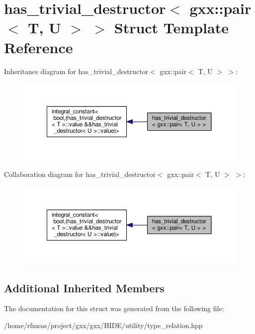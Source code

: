 \hypertarget{structhas__trivial__destructor_3_01gxx_1_1pair_3_01T_00_01U_01_4_01_4}{}\section{has\+\_\+trivial\+\_\+destructor$<$ gxx\+:\+:pair$<$ T, U $>$ $>$ Struct Template Reference}
\label{structhas__trivial__destructor_3_01gxx_1_1pair_3_01T_00_01U_01_4_01_4}


Inheritance diagram for has\+\_\+trivial\+\_\+destructor$<$ gxx\+:\+:pair$<$ T, U $>$ $>$\+:
\nopagebreak
\begin{figure}[H]
\begin{center}
\leavevmode
\includegraphics[width=350pt]{structhas__trivial__destructor_3_01gxx_1_1pair_3_01T_00_01U_01_4_01_4__inherit__graph}
\end{center}
\end{figure}


Collaboration diagram for has\+\_\+trivial\+\_\+destructor$<$ gxx\+:\+:pair$<$ T, U $>$ $>$\+:
\nopagebreak
\begin{figure}[H]
\begin{center}
\leavevmode
\includegraphics[width=350pt]{structhas__trivial__destructor_3_01gxx_1_1pair_3_01T_00_01U_01_4_01_4__coll__graph}
\end{center}
\end{figure}
\subsection*{Additional Inherited Members}


The documentation for this struct was generated from the following file\+:\begin{DoxyCompactItemize}
\item 
/home/rfmeas/project/gxx/gxx/\+H\+I\+D\+E/utility/type\+\_\+relation.\+hpp\end{DoxyCompactItemize}
